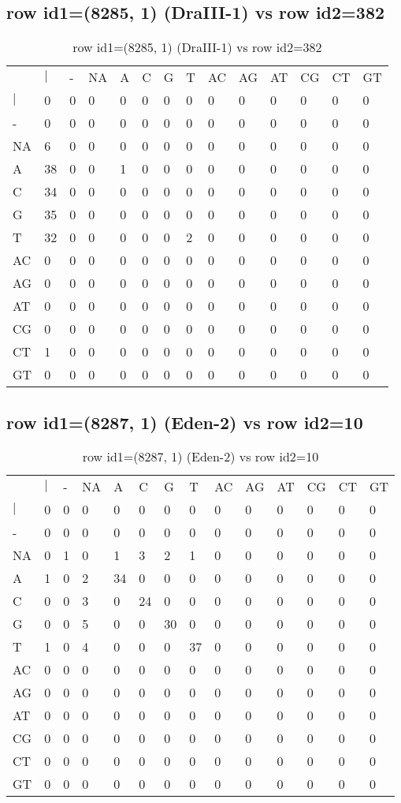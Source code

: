 \subsection{row id1=(8285, 1) (DraIII-1) vs row id2=382}
\begin{center}
\begin{longtable}{|l|l|l|l|l|l|l|l|l|l|l|l|l|l|}
\caption{row id1=(8285, 1) (DraIII-1) vs row id2=382} \label{table_dm250}\\
\hline
\\
\hline
&$|$&-&NA&A&C&G&T&AC&AG&AT&CG&CT&GT\\
$|$&0&0&0&0&0&0&0&0&0&0&0&0&0\\
-&0&0&0&0&0&0&0&0&0&0&0&0&0\\
NA&6&0&0&0&0&0&0&0&0&0&0&0&0\\
A&38&0&0&1&0&0&0&0&0&0&0&0&0\\
C&34&0&0&0&0&0&0&0&0&0&0&0&0\\
G&35&0&0&0&0&0&0&0&0&0&0&0&0\\
T&32&0&0&0&0&0&2&0&0&0&0&0&0\\
AC&0&0&0&0&0&0&0&0&0&0&0&0&0\\
AG&0&0&0&0&0&0&0&0&0&0&0&0&0\\
AT&0&0&0&0&0&0&0&0&0&0&0&0&0\\
CG&0&0&0&0&0&0&0&0&0&0&0&0&0\\
CT&1&0&0&0&0&0&0&0&0&0&0&0&0\\
GT&0&0&0&0&0&0&0&0&0&0&0&0&0\\
\hline
\end{longtable}
\end{center}

\subsection{row id1=(8287, 1) (Eden-2) vs row id2=10}
\begin{center}
\begin{longtable}{|l|l|l|l|l|l|l|l|l|l|l|l|l|l|}
\caption{row id1=(8287, 1) (Eden-2) vs row id2=10} \label{table_dm252}\\
\hline
\\
\hline
&$|$&-&NA&A&C&G&T&AC&AG&AT&CG&CT&GT\\
$|$&0&0&0&0&0&0&0&0&0&0&0&0&0\\
-&0&0&0&0&0&0&0&0&0&0&0&0&0\\
NA&0&1&0&1&3&2&1&0&0&0&0&0&0\\
A&1&0&2&34&0&0&0&0&0&0&0&0&0\\
C&0&0&3&0&24&0&0&0&0&0&0&0&0\\
G&0&0&5&0&0&30&0&0&0&0&0&0&0\\
T&1&0&4&0&0&0&37&0&0&0&0&0&0\\
AC&0&0&0&0&0&0&0&0&0&0&0&0&0\\
AG&0&0&0&0&0&0&0&0&0&0&0&0&0\\
AT&0&0&0&0&0&0&0&0&0&0&0&0&0\\
CG&0&0&0&0&0&0&0&0&0&0&0&0&0\\
CT&0&0&0&0&0&0&0&0&0&0&0&0&0\\
GT&0&0&0&0&0&0&0&0&0&0&0&0&0\\
\hline
\end{longtable}
\end{center}

